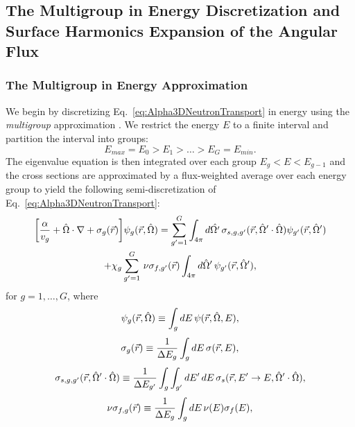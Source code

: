 \subsection{The Multigroup in Energy Discretization and Surface Harmonics Expansion of the Angular Flux}

\subsubsection{The Multigroup in Energy Approximation}

We begin by discretizing Eq.~\ref{eq:Alpha3DNeutronTransport} in energy using the \textit{multigroup} approximation \cite{duderstadt_nuclear_1976}. We restrict the energy $E$ to a finite interval and partition the interval into groups:
\begin{equation*}
	E_{max} = E_{0} > E_{1} > \dots > E_{G} = E_{min}.
\end{equation*}
The eigenvalue equation is then integrated over each group $E_{g} < E < E_{g-1}$ and the cross sections are approximated by a flux-weighted average over each energy group to yield the following semi-discretization of Eq.~\ref{eq:Alpha3DNeutronTransport}:
\begin{multline}
	\bigg [ \frac{\alpha}{v_{g}} + \hat{\Omega} \cdot \nabla + \sigma_{g}(\vec{r}) \bigg ] \psi_{g}(\vec{r},\hat{\Omega}) = \sum_{g'=1}^{G} \int_{4\pi} \mathop{}\!d \hat{\Omega'} \, \sigma_{s,g,g'}(\vec{r},\hat{\Omega}' \cdot \hat{\Omega}) \psi_{g'}(\vec{r},\hat{\Omega}') \\ + \chi_{g} \sum_{g'=1}^{G} \, \nu\sigma_{f,g'}(\vec{r}) \int_{4\pi} \mathop{}\!d \hat{\Omega}' \, \psi_{g'}(\vec{r},\hat{\Omega}'), 
	\label{eq:Alpha3DMG}
\end{multline}
for $g = 1, \dots, G$, where
\begin{equation}
	\psi_{g}(\vec{r},\hat{\Omega}) \equiv \int_{g} \mathop{}\!d E \, \psi(\vec{r},\hat{\Omega},E),
\end{equation}
\begin{equation}
	 \sigma_{g}(\vec{r}) \equiv \frac{1}{\Delta E_{g}} \int_{g} \mathop{}\!d E \, \sigma(\vec{r},E),
\end{equation}
\begin{equation}
	 \sigma_{s,g,g'}(\vec{r},\hat{\Omega}' \cdot \hat{\Omega}) \equiv \frac{1}{\Delta E_{g'}} \int_{g} \int_{g'} \mathop{}\!d E' \mathop{}\!d E \, \sigma_{s}(\vec{r},E'\rightarrow E,\hat{\Omega}' \cdot \hat{\Omega}),
\end{equation}
\begin{equation}
	\nu\sigma_{f,g}(\vec{r}) \equiv \frac{1}{\Delta E_{g}} \int_{g} \mathop{}\!d E \, \nu(E) \sigma_{f}(E),
\end{equation}
